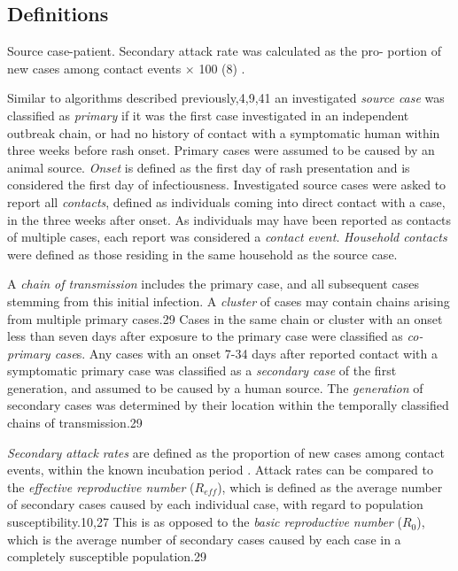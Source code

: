\subsection{Definitions}
Source case-patient. Secondary attack rate was calculated as the pro- portion of new cases among contact events × 100 (8) \cite{Dixon2015}.

Similar to algorithms described previously,4,9,41 an investigated \textit{source case} was classified as \textit{primary} if it was the first case investigated in an independent outbreak chain, or had no history of contact with a symptomatic human within three weeks before rash onset. Primary cases were assumed to be caused by an animal source. \textit{Onset} is defined as the first day of rash presentation and is considered the first day of infectiousness. Investigated source cases were asked to report all \textit{contacts}, defined as individuals coming into direct contact with a case, in the three weeks after onset. As individuals may have been reported as contacts of multiple cases, each report was considered a \textit{contact event}. \textit{Household contacts} were defined as those residing in the same household as the source case.

A \textit{chain of transmission} includes the primary case, and all subsequent cases stemming from this initial infection. A \textit{cluster} of cases may contain chains arising from multiple primary cases.29 Cases in the same chain or cluster with an onset less than seven days after exposure to the primary case were classified as \textit{co-primary case}s. Any cases with an onset 7-34 days after reported contact with a symptomatic primary case was classified as a \textit{secondary case} of the first generation, and assumed to be caused by a human source. The \textit{generation} of secondary cases was determined by their location within the temporally classified chains of transmission.29

\textit{Secondary attack rates} are defined as the proportion of new cases among contact events, within the known incubation period \cite{Dixon2015}. Attack rates can be compared to the \textit{effective reproductive number} ($R_{eff}$), which is defined as the average number of secondary cases caused by each individual case, with regard to population susceptibility.10,27 This is as opposed to the \textit{basic reproductive number} ($R_{0}$), which is the average number of secondary cases caused by each case in a completely susceptible population.29 